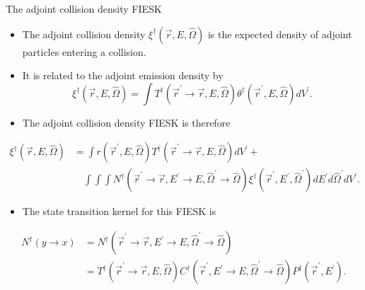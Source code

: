 \documentclass{beamer}
\begin{document}
\begin{frame}{The adjoint collision density FIESK}

  \begin{itemize}
    \item The adjoint collision density $\xi^{\dagger}(\vec{r},E,\hat{\Omega})$
      is the expected density of adjoint particles entering a collision.
    \item It is related to the adjoint emission density by
      \begin{equation*}
        \xi^{\dagger}(\vec{r},E,\hat{\Omega}) =
        \int T^{\dagger}(\vec{r}^{'} \to \vec{r},E,\hat{\Omega})
        \theta^{\dagger}(\vec{r}^{'},E,\hat{\Omega}) dV^{'}.
      \end{equation*}
    \item The adjoint collision density FIESK is therefore
  \end{itemize}
  \begin{align}
    \xi^{\dagger}(\vec{r},E,\hat{\Omega}) & = \int r(\vec{r}^{'},E,\hat{\Omega})
    T^{\dagger}(\vec{r}^{'} \to \vec{r},E,\hat{\Omega}) dV^{'} + \nonumber \\
    &\quad \int\int\int N^{\dagger}(\vec{r}^{'} \to \vec{r},E^{'} \to E,
    \hat{\Omega}^{'} \to \hat{\Omega}) 
    \xi^{\dagger}(\vec{r}^{'},E^{'},\hat{\Omega}^{'})
    dE^{'}d\hat{\Omega}^{'}dV^{'}. \nonumber
  \end{align}
  
  \begin{itemize}
    \item The state transition kernel for this FIESK is
  \end{itemize}
  \begin{align}
    N^{\dagger}(y \to x) & =
    N^{\dagger}(\vec{r}^{'} \to \vec{r},E^{'} \to E,\hat{\Omega}^{'} \to \hat{\Omega})
    \nonumber \\
    & = T^{\dagger}(\vec{r}^{'} \to \vec{r},E,\hat{\Omega})
    C^{\dagger}(\vec{r}^{'},E^{'} \to E,\hat{\Omega}^{'} \to \hat{\Omega})
    P^{\dagger}(\vec{r}^{'},E^{'}). \nonumber
  \end{align}
  
\end{frame}
\end{document}
